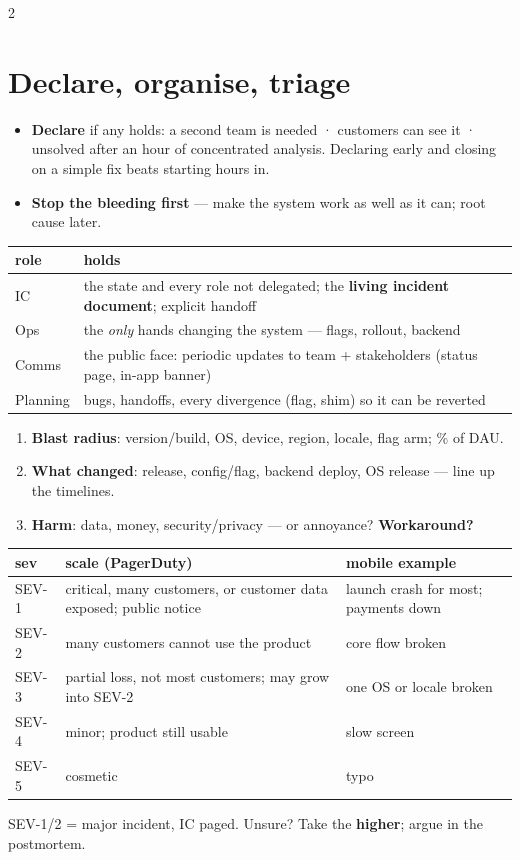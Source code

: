 \documentclass[8pt]{extarticle}
\begin{document}
\begin{multicols}{2}
\section{Declare, organise, triage}
\begin{itemize}
  \item \textbf{Declare} if any holds: a second team is needed · customers can see it · unsolved after an hour of
        concentrated analysis. Declaring early and closing on a simple fix beats starting hours in.
  \item \textbf{Stop the bleeding first} — make the system work as well as it can; root cause later.
\end{itemize}
{\footnotesize\setlength{\tabcolsep}{2.5pt}
\begin{tabular}{@{}>{\raggedright\arraybackslash}p{10mm}>{\raggedright\arraybackslash}p{66mm}@{}}
\toprule
\textbf{role} & \textbf{holds}\\ \midrule
IC & the state and every role not delegated; the \textbf{living incident document}; explicit handoff\\
Ops & the \emph{only} hands changing the system — flags, rollout, backend\\
Comms & the public face: periodic updates to team + stakeholders (status page, in-app banner)\\
Planning & bugs, handoffs, every divergence (flag, shim) so it can be reverted\\
\bottomrule
\end{tabular}}
\begin{enumerate}
  \item \textbf{Blast radius}: version/build, OS, device, region, locale, flag arm; \% of DAU.
  \item \textbf{What changed}: release, config/flag, backend deploy, OS release — line up the timelines.
  \item \textbf{Harm}: data, money, security/privacy — or annoyance? \textbf{Workaround?}
\end{enumerate}
{\footnotesize\setlength{\tabcolsep}{2.5pt}
\begin{tabular}{@{}>{\raggedright\arraybackslash}p{8mm}>{\raggedright\arraybackslash}p{38mm}>{\raggedright\arraybackslash}p{30mm}@{}}
\toprule
\textbf{sev} & \textbf{scale (PagerDuty)} & \textbf{mobile example}\\ \midrule
SEV-1 & critical, many customers, or customer data exposed; public notice & launch crash for most; payments down\\
SEV-2 & many customers cannot use the product & core flow broken\\
SEV-3 & partial loss, not most customers; may grow into SEV-2 & one OS or locale broken\\
SEV-4 & minor; product still usable & slow screen\\
SEV-5 & cosmetic & typo\\
\bottomrule
\end{tabular}}\par
SEV-1/2 = major incident, IC paged. Unsure? Take the \textbf{higher}; argue in the postmortem.


\end{multicols}
\end{document}
